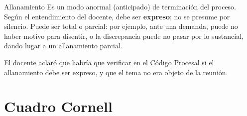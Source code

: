 \documentclass[12pt,oneside]{book}
\begin{document}
\begin{definition}{Allanamiento}
Es un modo anormal (anticipado) de terminación del proceso. Según el entendimiento del docente, debe ser \textbf{expreso}; no se presume por silencio. Puede ser total o parcial: por ejemplo, ante una demanda, puede no haber motivo para disentir, o la discrepancia puede no pasar por lo sustancial, dando lugar a un allanamiento parcial.
\end{definition}

El docente aclaró que habría que verificar en el Código Procesal si el allanamiento debe ser expreso, y que el tema no era objeto de la reunión.

\section{Cuadro Cornell}
\end{document}
